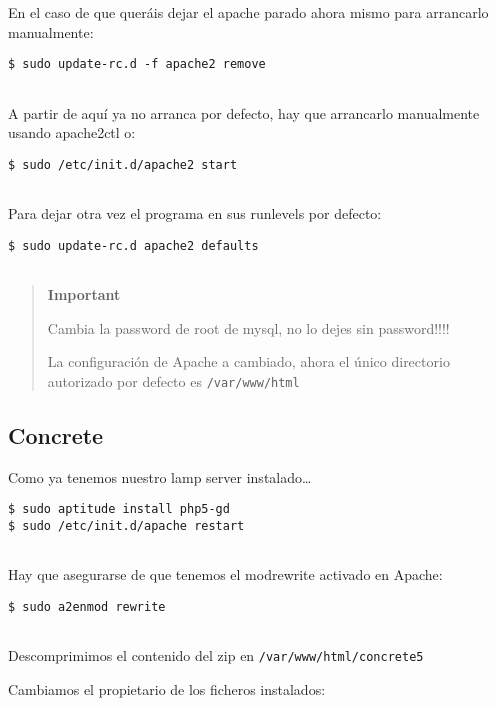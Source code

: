 En el caso de que queráis dejar el apache parado ahora mismo para
arrancarlo manualmente:

\begin{verbatim}
$ sudo update-rc.d -f apache2 remove
      
\end{verbatim}

A partir de aquí ya no arranca por defecto, hay que arrancarlo
manualmente usando apache2ctl o:

\begin{verbatim}
$ sudo /etc/init.d/apache2 start
      
\end{verbatim}

Para dejar otra vez el programa en sus runlevels por defecto:

\begin{verbatim}
$ sudo update-rc.d apache2 defaults
      
\end{verbatim}

\begin{quote}
\textbf{Important}

Cambia la password de root de mysql, no lo dejes sin password!!!!

La configuración de Apache a cambiado, ahora el único directorio
autorizado por defecto es \texttt{/var/www/html}
\end{quote}

\subsection{Concrete}\label{concrete}

Como ya tenemos nuestro lamp server instalado\ldots{}

\begin{verbatim}
$ sudo aptitude install php5-gd
$ sudo /etc/init.d/apache restart
      
\end{verbatim}

Hay que asegurarse de que tenemos el modrewrite activado en Apache:

\begin{verbatim}
$ sudo a2enmod rewrite
      
\end{verbatim}

Descomprimimos el contenido del zip en \texttt{/var/www/html/concrete5}

Cambiamos el propietario de los ficheros instalados:

